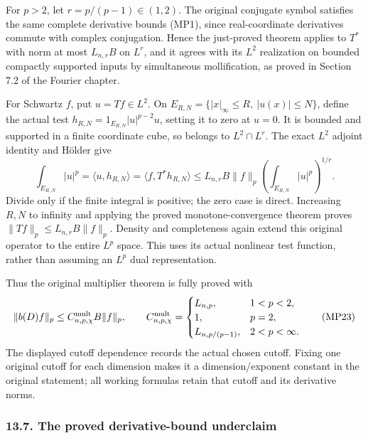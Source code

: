 \documentclass[
  11pt,
]{article}
\makeatletter
\let\ReaderOriginalAnchorStart\hyper@anchorstart
\let\ReaderOriginalAnchorEnd\hyper@anchorend
\let\ReaderPendingAliases\@empty
\def\ReaderArmAliases#1{\gdef\ReaderPendingAliases{#1}}
\def\hyper@anchorstart#1{\ReaderIfNativeAnchorTF{#1}{\ReaderPendingAliases\global\let\ReaderPendingAliases\@empty}{}\ReaderOriginalAnchorStart{#1}}
\makeatother
\begin{document}
For \(p>2\), let \(r=p/(p-1)\in(1,2)\). The original conjugate symbol
satisfies the same complete derivative bounds (MP1), since
real-coordinate derivatives commute with complex conjugation. Hence the
just-proved theorem applies to \(T^*\) with norm at most \(L_{n,r}B\) on
\(L^r\), and it agrees with its \(L^2\) realization on bounded compactly
supported inputs by simultaneous mollification, as proved in Section 7.2
of the Fourier chapter.

For Schwartz \(f\), put \(u=Tf\in L^2\). On
\(E_{R,N}=\{|x|_\infty\leq R,\ |u(x)|\leq N\}\), define the actual test
\(h_{R,N}=1_{E_{R,N}}|u|^{p-2}u\), setting it to zero at \(u=0\). It is
bounded and supported in a finite coordinate cube, so belongs to
\(L^2\cap L^r\). The exact \(L^2\) adjoint identity and Hölder give \[
 \int_{E_{R,N}}|u|^p
   =\langle u,h_{R,N}\rangle
   =\langle f,T^*h_{R,N}\rangle
   \leq L_{n,r}B\|f\|_p
                \left(\int_{E_{R,N}}|u|^p\right)^{1/r}.
                                                               \tag{MP22}
\] Divide only if the finite integral is positive; the zero case is
direct. Increasing \(R,N\) to infinity and applying the proved
monotone-convergence theorem proves \(\|Tf\|_p\leq L_{n,r}B\|f\|_p\).
Density and completeness again extend this original operator to the
entire \(L^p\) space. This uses its actual nonlinear test function,
rather than assuming an \(L^p\) dual representation.

Thus the original multiplier theorem is fully proved with \[
 \|b(D)f\|_p\leq C^{\rm mult}_{n,p,\chi}B\|f\|_p,\qquad
 C^{\rm mult}_{n,p,\chi}=
 \begin{cases}
 L_{n,p},&1<p<2,\\
 1,&p=2,\\
 L_{n,p/(p-1)},&2<p<\infty .
 \end{cases}                                                   \tag{MP23}
\] The displayed cutoff dependence records the actual chosen cutoff.
Fixing one original cutoff for each dimension makes it a
dimension/exponent constant in the original statement; all working
formulas retain that cutoff and its derivative norms.

\ReaderArmAliases{\ReaderOriginalAnchorStart{AN03-LCE-MULT-007}\ReaderOriginalAnchorEnd\begingroup\expandafter\def\csname @currentHref\endcsname{AN03-LCE-MULT-007}\label{AN03-LCE-MULT-007}\endgroup\ReaderOriginalAnchorStart{the-proved-derivative-bound-underclaim}\ReaderOriginalAnchorEnd}
\subsubsection{13.7. The proved derivative-bound
underclaim}\label{the-proved-derivative-bound-underclaim}
\end{document}
